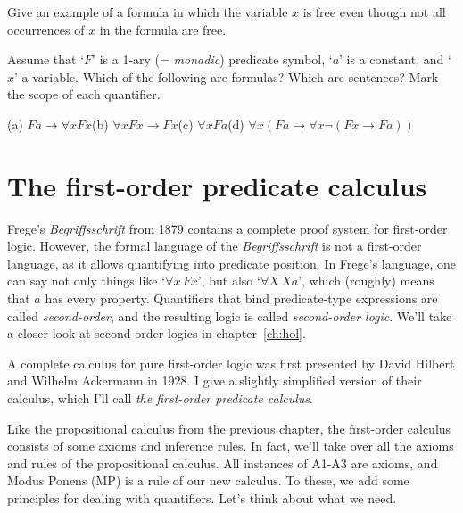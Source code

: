 \begin{exercise}
  Give an example of a formula in which the variable $x$ is free even though
  not all occurrences of $x$ in the formula are free.
\end{exercise}

\begin{exercise}
  Assume that `$F$' is a 1-ary (= \emph{monadic}) predicate symbol, `$a$' is a constant, and `$x$' a variable.
  Which of the following are formulas?
  Which are sentences?
  Mark the scope of each quantifier.

  (a) $Fa \to \forall x Fx$\quad (b) $\forall x Fx \to Fx$\quad (c) $\forall x Fa$\quad (d) $\forall x (Fa \to \forall x \neg (Fx \to Fa))$
\end{exercise}


\section{The first-order predicate calculus}

Frege's \emph{Begriffsschrift} from 1879
contains a complete proof system for first-order logic.
However,
the formal language of the \emph{Begriffsschrift} is not a first-order language,
as it allows quantifying into predicate position.
In Frege's language,
one can say not only things like `$\forall x\, Fx$',
but also `$\forall X\, Xa$',
which (roughly) means that $a$ has every property.
Quantifiers that bind predicate-type expressions are called \emph{second-order},
and the resulting logic is called \emph{second-order logic}.
We'll take a closer look at second-order logics in chapter~\ref{ch:hol}.

A complete calculus for pure first-order logic was first presented
by David Hilbert and Wilhelm Ackermann in 1928.
I give a slightly simplified version of their calculus,
which I'll call \emph{the first-order predicate calculus}.

Like the propositional calculus from the previous chapter,
the first-order calculus consists of some axioms and inference rules.
In fact,
we'll take over all the axioms and rules of the propositional calculus.
All instances of A1-A3 are axioms,
and Modus Ponens (MP) is a rule of our new calculus.
To these,
we add some principles for dealing with quantifiers.
Let's think about what we need.

